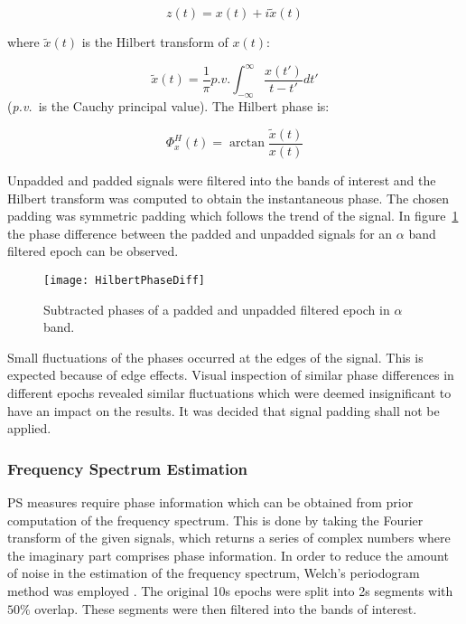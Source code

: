 			\begin{equation}\label{eq:analytic-signal}
				z(t) = x(t) + i\tilde{x}(t)
			\end{equation}
			
			where \(\tilde{x}(t)\) is the Hilbert transform of \({x}(t)\):

			\begin{equation}\label{eq:hilbert-transform}
				\tilde{x}(t) = \frac{1}{\pi} p.v. \int_{-\infty}^{\infty} \frac{x({t}')}{t-{t}'}d{t'} 
			\end{equation}
			(\textit{p.v.}\ is the Cauchy principal value). The Hilbert phase is:
			
			\begin{equation}\label{eq:hilbert-phase}
				\Phi_{x}^{H}(t) = \arctan \frac{\tilde{x}(t)}{x(t)}
			\end{equation}

			Unpadded and padded signals were filtered into the bands of interest and the Hilbert transform was computed to obtain the instantaneous phase. The chosen padding was symmetric padding which follows the trend of the signal. In figure~\ref{fig:hilbert-difference} the phase difference between the padded and unpadded signals for an \(\alpha\) band filtered epoch can be observed.    

			\begin{figure}
			    \centering
			    \texttt{[image: HilbertPhaseDiff]}
			    \caption{Subtracted phases of a padded and unpadded filtered epoch in \(\alpha\) band.}
			    \label{fig:hilbert-difference}
			\end{figure}	

			Small fluctuations of the phases occurred at the edges of the signal. This is expected because of edge effects. Visual inspection of similar phase differences in different epochs revealed similar fluctuations which were deemed insignificant to have an impact on the results. It was decided that signal padding shall not be applied.

			\subsubsection{Frequency Spectrum Estimation}
			\ac{PS} measures require phase information which can be obtained from prior computation of the frequency spectrum. This is done by taking the Fourier transform of the given signals, which returns a series of complex numbers where the imaginary part comprises phase information. In order to reduce the amount of noise in the estimation of the frequency spectrum, Welch's periodogram method was employed \autocite{Welch1967}. The original 10s epochs were split into 2s segments with \(50\%\) overlap. These segments were then filtered into the bands of interest.

